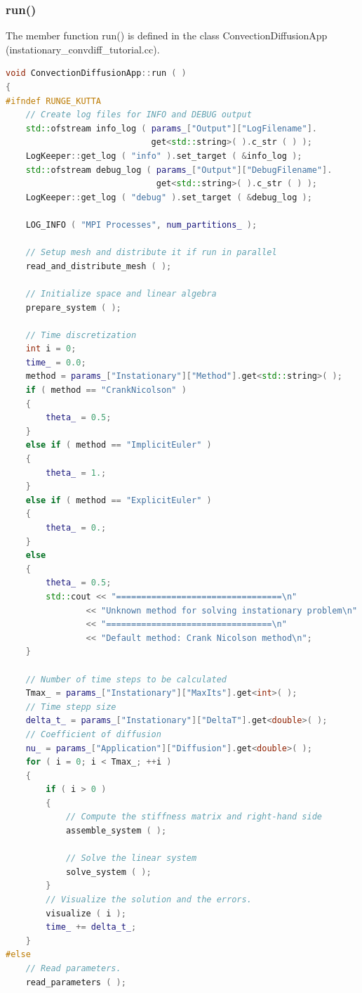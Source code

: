 \documentclass[a4paper, 11pt, twoside]{article}
\begin{document}
\subsubsection{run()}
The member function run() is defined in the class ConvectionDiffusionApp (instationary\_convdiff\_tutorial.cc).
\begin{lstlisting}[language=C++, basicstyle={\footnotesize, \ttfamily}, keywordstyle=\color{blue}, numbers=none, tabsize=4]
void ConvectionDiffusionApp::run ( )
{
#ifndef RUNGE_KUTTA
    // Create log files for INFO and DEBUG output
    std::ofstream info_log ( params_["Output"]["LogFilename"].
                             get<std::string>( ).c_str ( ) );
    LogKeeper::get_log ( "info" ).set_target ( &info_log );
    std::ofstream debug_log ( params_["Output"]["DebugFilename"].
                              get<std::string>( ).c_str ( ) );
    LogKeeper::get_log ( "debug" ).set_target ( &debug_log );

    LOG_INFO ( "MPI Processes", num_partitions_ );

    // Setup mesh and distribute it if run in parallel
    read_and_distribute_mesh ( );

    // Initialize space and linear algebra
    prepare_system ( );

    // Time discretization
    int i = 0;
    time_ = 0.0;
    method = params_["Instationary"]["Method"].get<std::string>( );
    if ( method == "CrankNicolson" )
    {
        theta_ = 0.5;
    }
    else if ( method == "ImplicitEuler" )
    {
        theta_ = 1.;
    }
    else if ( method == "ExplicitEuler" )
    {
        theta_ = 0.;
    }
    else
    {
        theta_ = 0.5;
        std::cout << "=================================\n"
                << "Unknown method for solving instationary problem\n"
                << "=================================\n"
                << "Default method: Crank Nicolson method\n";
    }

    // Number of time steps to be calculated
    Tmax_ = params_["Instationary"]["MaxIts"].get<int>( );
    // Time stepp size
    delta_t_ = params_["Instationary"]["DeltaT"].get<double>( );
    // Coefficient of diffusion
    nu_ = params_["Application"]["Diffusion"].get<double>( );
    for ( i = 0; i < Tmax_; ++i )
    {
        if ( i > 0 )
        {
            // Compute the stiffness matrix and right-hand side
            assemble_system ( );

            // Solve the linear system
            solve_system ( );
        }
        // Visualize the solution and the errors.
        visualize ( i );
        time_ += delta_t_;
    }
#else
    // Read parameters.
    read_parameters ( );


\end{lstlisting}
\end{document}

